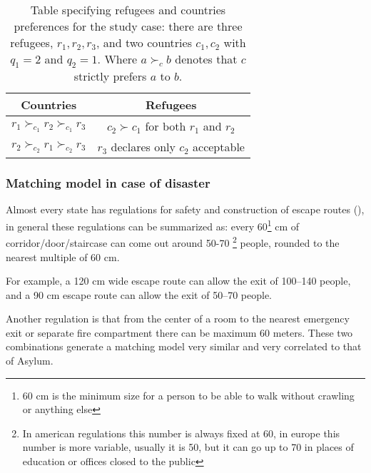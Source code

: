 \documentclass[letterpaper]{article} %
\begin{document}
    \begin{table}[!htb]
        \begin{tabular}{c|c}
            \hline Countries                                          & Refugees                                                   \\
            \hline\( r_{1} \succ_{c_{1}} r_{2} \succ_{c_{1}} r_{3} \) & \( c_{2} \succ c_{1} \) for both \( r_{1} \) and \( r_{2} \) \\
            \( r_{2} \succ_{c_{2}} r_{1} \succ_{c_{2}} r_{3} \)       & \( r_{3} \) declares only \( c_{2} \) acceptable           \\
            \hline
        \end{tabular}
        \caption{Table specifying refugees and countries preferences for
        the study case: there are three refugees, \( r _ { 1 } , r _ { 2 } , r _ { 3 } \), and two countries \( c _ { 1 } , c _ { 2 } \) with \( q _ { 1 } = 2 \) and \( q _ { 2 } = 1 \).
        Where \( a \succ_{c} b \) denotes that \( c \) strictly prefers \( a \) to \( b \).}
        \label{tab:countries-refugees}
    \end{table}

    \subsubsection{Matching model in case of disaster}\label{matching-model-in-case-of-disaster}%
    Almost every state has regulations for safety and construction of escape routes
    (\citet{it-81-2008,uk-1541-2005,usa-1910-1974,cee-654-1989,cee-567-1977}), in general these
    regulations can be summarized as: every 60\footnote{60 cm is the minimum size for a person to be
    able to walk without crawling or anything else} cm of corridor/door/staircase can come out around 50-70
    \footnote{In american regulations this number is always fixed at 60, in europe this number is more
    variable, usually it is 50, but it can go up to 70 in places of education or offices closed to the public}
    people, rounded to the nearest multiple of 60 cm.

    For example, a 120 cm wide escape route can allow the exit of 100--140 people, and a 90 cm
    escape route can allow the exit of 50--70 people.

    Another regulation is that from the center of a room to the nearest emergency exit or separate
    fire compartment there can be maximum 60 meters.
    These two combinations generate a matching model
    very similar and very correlated to that of Asylum.
\end{document}
